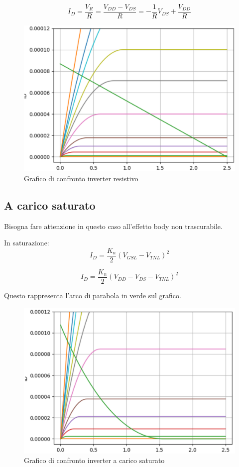 \begin{equation*}
    I_D = \frac{V_R}{R} = \frac{V_{DD} - V_{DS}}{R} = -\frac{1}{R}V_{DS} + \frac{V_{DD}}{R}
\end{equation*}

\begin{figure}[htbp]
    \centering
    \includegraphics[width=0.5\linewidth]{img/carico_resistivo_cfre.png}
    \caption{Grafico di confronto inverter resistivo}
    
\end{figure}

\subsection{A carico saturato}

Bisogna fare attenzione in questo caso all'effetto body non trascurabile.


In saturazione: 
\begin{equation*}
    I_D = \frac{K_n}{2}(V_{GSL} - V_{TNL})^2
\end{equation*}

\begin{equation*}
    I_D = \frac{K_n}{2}(V_{DD} -V_{DS} -  V_{TNL})^2
\end{equation*}

Questo rappresenta l'arco di parabola in verde sul grafico.



\begin{figure}[htbp]
    \centering
    \includegraphics[width=0.5\linewidth]{img/a_saturamento_cfr.png}
    \caption{Grafico di confronto inverter a carico saturato}
\end{figure}


